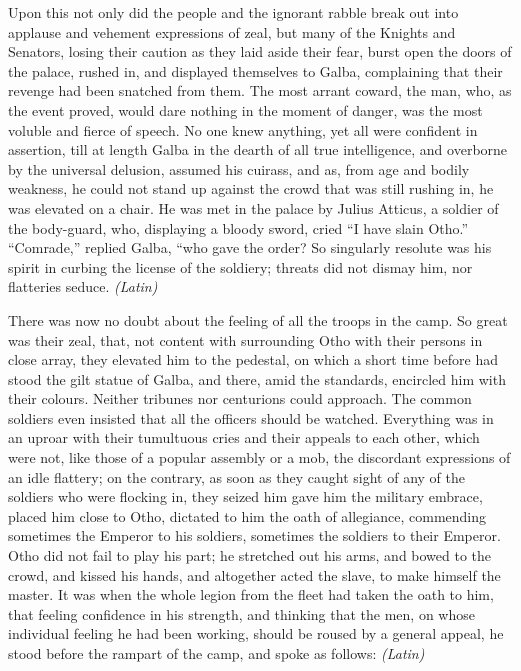 Upon this not only did the people and the ignorant rabble break out into applause and vehement expressions of zeal, but many of the Knights and Senators, losing their caution as they laid aside their fear, burst open the doors of the palace, rushed in, and displayed themselves to Galba, complaining that their revenge had been snatched from them. The most arrant coward, the man, who, as the event proved, would dare nothing in the moment of danger, was the most voluble and fierce of speech. No one knew anything, yet all were confident in assertion, till at length Galba in the dearth of all true intelligence, and overborne by the universal delusion, assumed his cuirass, and as, from age and bodily weakness, he could not stand up against the crowd that was still rushing in, he was elevated on a chair. He was met in the palace by Julius Atticus, a soldier of the body-guard, who, displaying a bloody sword, cried ``I have slain Otho.'' ``Comrade,'' replied Galba, ``who gave the order? So singularly resolute was his spirit in curbing the license of the soldiery; threats did not dismay him, nor flatteries seduce. \emph{(Latin)}


There was now no doubt about the feeling of all the troops in the camp. So great was their zeal, that, not content with surrounding Otho with their persons in close array, they elevated him to the pedestal, on which a short time before had stood the gilt statue of Galba, and there, amid the standards, encircled him with their colours. Neither tribunes nor centurions could approach. The common soldiers even insisted that all the officers should be watched. Everything was in an uproar with their tumultuous cries and their appeals to each other, which were not, like those of a popular assembly or a mob, the discordant expressions of an idle flattery; on the contrary, as soon as they caught sight of any of the soldiers who were flocking in, they seized him gave him the military embrace, placed him close to Otho, dictated to him the oath of allegiance, commending sometimes the Emperor to his soldiers, sometimes the soldiers to their Emperor. Otho did not fail to play his part; he stretched out his arms, and bowed to the crowd, and kissed his hands, and altogether acted the slave, to make himself the master. It was when the whole legion from the fleet had taken the oath to him, that feeling confidence in his strength, and thinking that the men, on whose individual feeling he had been working, should be roused by a general appeal, he stood before the rampart of the camp, and spoke as follows: \emph{(Latin)}

